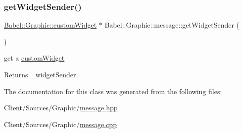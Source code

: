 \subsubsection{\texorpdfstring{get\+Widget\+Sender()}{getWidgetSender()}}
{\footnotesize\ttfamily \hyperlink{classBabel_1_1Graphic_1_1customWidget}{Babel\+::\+Graphic\+::custom\+Widget} $\ast$ Babel\+::\+Graphic\+::message\+::get\+Widget\+Sender (\begin{DoxyParamCaption}{ }\end{DoxyParamCaption})}

get a \hyperlink{classBabel_1_1Graphic_1_1customWidget}{custom\+Widget} \begin{DoxyReturn}{Returns}
\+\_\+widget\+Sender 
\end{DoxyReturn}


The documentation for this class was generated from the following files\+:\begin{DoxyCompactItemize}
\item 
Client/\+Sources/\+Graphic/\hyperlink{message_8hpp}{message.\+hpp}\item 
Client/\+Sources/\+Graphic/\hyperlink{message_8cpp}{message.\+cpp}\end{DoxyCompactItemize}
